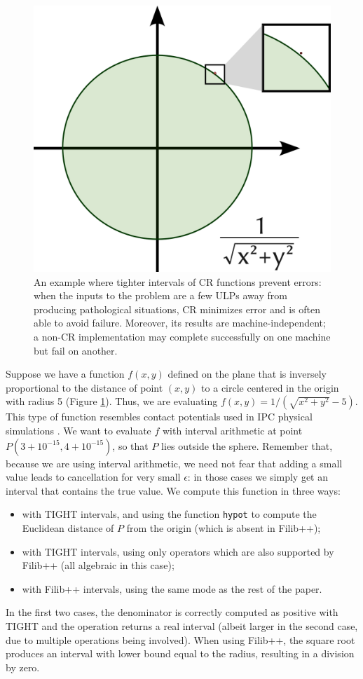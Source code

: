 \begin{figure}
	\includegraphics[width=0.8\linewidth]{fig/example.png}
	\centering
	\caption{An example where tighter intervals of CR functions prevent errors: when the inputs to the problem are a few ULPs away from producing pathological situations, CR minimizes error and is often able to avoid failure. Moreover, its results are machine-independent; a non-CR implementation may complete successfully on one machine but fail on another.}
	\label{fig:circle}
\end{figure}
Suppose we have a function $f(x,y)$ defined on the plane that is inversely proportional to the distance of point $(x,y)$ to a circle centered in the origin with radius 5 (Figure \ref{fig:circle}).
Thus, we are evaluating $f(x,y) = 1/(\sqrt{x^2 + y^2}-5)$.
This type of function resembles contact potentials used in IPC physical simulations \cite{Li2020IPC}.
We want to evaluate $f$ with interval arithmetic at point $P(3+10^{-15},4+10^{-15})$, so that $P$ lies outside the sphere. Remember that, because we are using interval arithmetic, we need not fear that adding a small value leads to cancellation for very small $\epsilon$: in those cases we simply get an interval that contains the true value.
We compute this function in three ways:
\begin{itemize}
	\item with TIGHT intervals, and using the function \texttt{hypot} to compute the Euclidean distance of $P$ from the origin (which is absent in Filib++);
	\item with TIGHT intervals, using only operators which are also supported by Filib++ (all algebraic in this case);
	\item with Filib++ intervals, using the same mode as the rest of the paper.
\end{itemize}
In the first two cases, the denominator is correctly computed as positive with TIGHT and the operation returns a real interval (albeit larger in the second case, due to multiple operations being involved).
When using Filib++, the square root produces an interval with lower bound equal to the radius, resulting in a division by zero.

